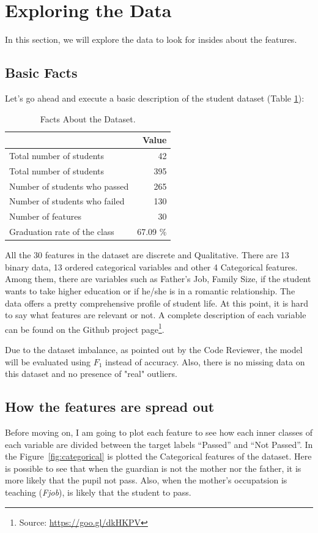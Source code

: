 \documentclass[a4paper]{article}
\begin{document}
\section{Exploring the Data}
\label{sec:exploring_data}
In this section, we will explore the data to look for insides about the features.

\subsection{Basic Facts}
Let's go ahead and execute a basic description of the student dataset (Table \ref{tab:basicfacts}):

\begin{table}[ht]
\centering
\begin{tabular}{l|r}
 & Value \\\hline
Total number of students & 42 \\
Total number of students & 395 \\
Number of students who passed & 265 \\
Number of students who failed & 130 \\
Number of features & 30 \\
Graduation rate of the class & 67.09 \%

\end{tabular}
\caption{\label{tab:basicfacts}Facts About the Dataset.}
\end{table}

All the 30 features in the dataset are discrete and Qualitative. There are 13 binary data, 13 ordered categorical variables and other 4 Categorical features. Among them, there are variables such as Father's Job, Family Size, if the student wants to take higher education or if he/she is in a romantic relationship. The data offers a pretty comprehensive profile of student life. At this point, it is hard to say what features are relevant or not. A complete description of each variable can be found on the Github project page\footnote{Source: \url{https://goo.gl/dkHKPV}}. 

Due to the dataset imbalance, as pointed out by the Code Reviewer, the model will be evaluated using $F_1$ instead of accuracy. Also, there is no missing data on this dataset and no presence of "real" outliers.

\subsection{How the features are spread out}
Before moving on, I am going to plot each feature to see how each inner classes of each variable are divided between the target labels ``Passed'' and ``Not Passed''. In the Figure~\ref{fig:categorical} is plotted the Categorical features of the dataset. Here is possible to see that when the guardian is not the mother nor the father, it is more likely that the pupil not pass. Also, when the mother's occupatsion is teaching (\textit{Fjob}), is likely that the student to pass.
\end{document}
